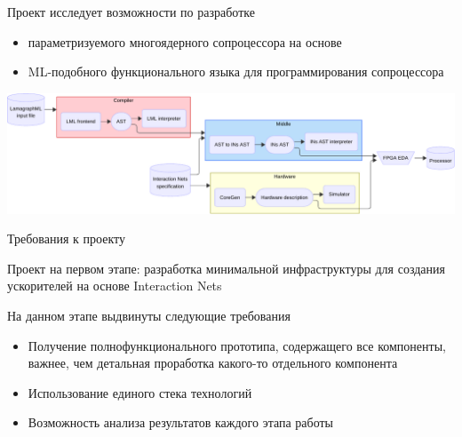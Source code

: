 \documentclass
  [ russian
  , aspectratio=169 %
  ] {beamer}
\begin{document}
\begin{frame}{\Lamagraph{}}

    Проект \Lamagraph{} исследует возможности по разработке
    \begin{itemize}
        \item параметризуемого многоядерного сопроцессора на основе \INs{}
        \item ML-подобного функционального языка для программирования сопроцессора
    \end{itemize}
    \begin{center}
        \includegraphics[width=\linewidth]{figures/lamagraph-big-horiz.pdf}
    \end{center}

\end{frame}

\begin{frame}{Требования к проекту}

    Проект на первом этапе: разработка минимальной инфраструктуры для создания ускорителей на основе Interaction Nets

    \vspace{1em}

    На данном этапе выдвинуты следующие требования
    \begin{itemize}
        \item Получение полнофункционального прототипа, содержащего все компоненты, важнее, чем детальная проработка какого-то отдельного компонента
        \item Использование единого стека технологий
        \item Возможность анализа результатов каждого этапа работы
    \end{itemize}

\end{frame}
\end{document}

